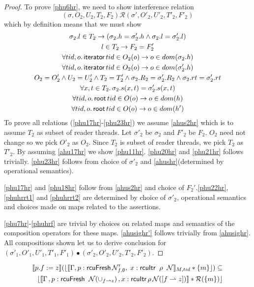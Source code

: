 \begin{proof}
To prove \ref{phu6hr}, we need to show interference relation
\[(\sigma, O_2, U_2, T_2,F_2) \mathcal{R} (\sigma', O'_2, U'_2, T'_2,F'_2)  \]
which by definition means that we must show 
\begin{gather}\label{phu17hr}
  \sigma_2.l  \in  T_2 \rightarrow (\sigma_2.h =\sigma'_2.h \land \sigma_2.l=\sigma'_2.l)\\
  \label{phu18hr}
  l\in T_2\rightarrow F_2=F_2'\\
  \label{phu20hr}
  \forall tid,o\ldotp\textsf{iterator} \, tid \in O_2(o) \rightarrow o \in dom(\sigma_2.h) \\
  \label{phu21hr}
  \forall tid,o\ldotp\textsf{iterator} \, tid \in O_2(o) \rightarrow o \in dom(\sigma'_2.h) \\
  \label{phu22hr}
  O_2 = O_2' \land U_2 = U_2' \land T_2 = T_2'\land \sigma_2.R_2 = \sigma_2'.R_2 \land \sigma_2.rt = \sigma'_2.rt \\
  \label{phu23hr}
  \forall x, t \in T_2 \ldotp \sigma_2.s(x,t) = \sigma'_2.s(x,t) \\
 \label{phuhrrt1}
  \forall tid,o\ldotp\textsf{root} \, tid \in O(o) \rightarrow o \in dom(h) \\
  \label{phuhrrt2}
  \forall tid,o\ldotp\textsf{root} \, tid \in O(o) \rightarrow o \in dom(h') 
\end{gather}
To prove all relations (\ref{phu17hr}-\ref{phu23hr}) we assume \ref{ahus2hr} which is to assume $T_2$ as subset of reader threads.  Let $\sigma'_2$ be $\sigma_2$ and $F'_2$ be $F_2$. $O_2$ need not change so we pick $O'_2$  as $O_2$. Since $T_2$ is subset of reader threads, we pick $T_2$ as  $T'_2$. By assuming \ref{ahu17hr}  we show \ref{phu11hr}. \ref{phu20hr} and \ref{phu21hr} follows trivially. \ref{phu23hr} follows from choice of $\sigma'_2$ and \ref{ahushr}(determined by operational semantics).

\ref{phu17hr} and \ref{phu18hr} follow from \ref{ahus2hr} and choice of $F_2'$.\ref{phu22hr}, \ref{phuhrrt1} and \ref{phuhrrt2} are determined by choice of $\sigma'_2$, operational semantics and choices made on maps related to the assertions. 

\ref{phu7hr}-\ref{phuhrf} are trivial by choices on related maps and semantics of the composition operators for these maps. \ref{ahusighr'} follows trivially from \ref{ahusighr}. All compositions shown let us to derive conclusion for $(\sigma'_1, O'_1, U'_1, T'_1,F'_1) \bullet (\sigma'_2, O'_2, U'_2, T'_2,F'_2) $.
 \end{proof}
 \begin{lemma}
   \label{lemma:writef}
   \begin{align*}
  \llbracket p.f := z \rrbracket (\lfloor \llbracket \Gamma, p:\textsf{rcuFresh}\,\mathcal{N}'_{f,\emptyset},\; x:\textsf{rcuItr}\;\; \rho \;\; \mathcal{N} \rrbracket_{M,tid} * \{m\}\rfloor)  \subseteq \\
  \lfloor \llbracket \Gamma \,, p : \textsf{rcuFresh} \;\; \mathcal{N}(\cup_{ f \rightharpoonup z}) \, , x:\textsf{rcuItr}\, \rho \, \mathcal{N}([f\rightharpoonup z]) \rrbracket  * \mathcal{R}(\{m\})\rfloor
\end{align*}
 \end{lemma}
